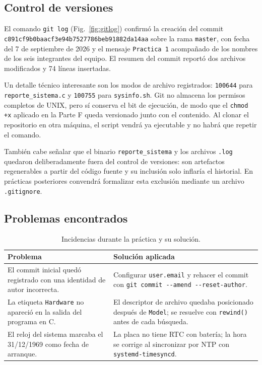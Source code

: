 \documentclass[conference]{IEEEtran}
\begin{document}
\subsection{Control de versiones}
El comando \texttt{git log} (Fig.~\ref{fig:gitlog}) confirmó la creación del commit \texttt{c891cf9b0baacf3e94b7527786beb91882da14aa} sobre la rama \texttt{master}, con fecha del 7 de septiembre de 2026 y el mensaje \texttt{Practica 1} acompañado de los nombres de los seis integrantes del equipo. El resumen del commit reportó dos archivos modificados y 74 líneas insertadas.

Un detalle técnico interesante son los modos de archivo registrados: \texttt{100644} para \texttt{reporte\_sistema.c} y \texttt{100755} para \texttt{sysinfo.sh}. Git no almacena los permisos completos de UNIX, pero sí conserva el bit de ejecución, de modo que el \texttt{chmod +x} aplicado en la Parte F queda versionado junto con el contenido. Al clonar el repositorio en otra máquina, el script vendrá ya ejecutable y no habrá que repetir el comando.

También cabe señalar que el binario \texttt{reporte\_sistema} y los archivos \texttt{.log} quedaron deliberadamente fuera del control de versiones: son artefactos regenerables a partir del código fuente y su inclusión solo inflaría el historial. En prácticas posteriores convendrá formalizar esta exclusión mediante un archivo \texttt{.gitignore}.

\subsection{Problemas encontrados}

\begin{table}[H]
	\centering
	\caption{Incidencias durante la práctica y su solución.}
	\label{tab:problemas}
	\begin{tabular}{|p{3.3cm}|p{4.1cm}|}
		\hline
		\textbf{Problema} & \textbf{Solución aplicada} \\
		\hline
		El commit inicial quedó registrado con una identidad de autor incorrecta. & Configurar \texttt{user.email} y rehacer el commit con \texttt{git commit -{}-amend -{}-reset-author}. \\
		\hline
		La etiqueta \texttt{Hardware} no apareció en la salida del programa en C. & El descriptor de archivo quedaba posicionado después de \texttt{Model}; se resuelve con \texttt{rewind()} antes de cada búsqueda. \\
		\hline
		El reloj del sistema marcaba el 31/12/1969 como fecha de arranque. & La placa no tiene RTC con batería; la hora se corrige al sincronizar por NTP con \texttt{systemd-timesyncd}. \\
		\hline
	\end{tabular}
\end{table}
\end{document}
